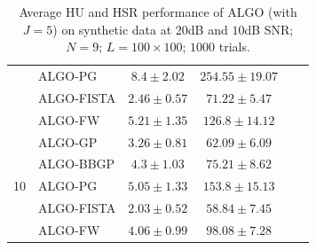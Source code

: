 \begin{table}[h]
\begin{adjustbox}{max width=\textwidth}
\begin{tabular}{|c|l|c|c|c|c|}
                    & ALGO-PG                    & $8.4      \pm 2.02$   & $254.55   \pm 19.07$ \tabularnewline
                    & ALGO-FISTA                 & $2.46     \pm 0.57$   & $71.22    \pm 5.47$  \tabularnewline
                    & ALGO-FW                    & $5.21     \pm 1.35$   & $126.8    \pm 14.12$ \tabularnewline \cline{1-4}
\multirow{5}{*}{10} & ALGO-GP                    & $3.26     \pm 0.81$   & $62.09    \pm 6.09$  \tabularnewline
                    & ALGO-BBGP                  & $4.3      \pm 1.03$   & $75.21    \pm 8.62$  \tabularnewline
                    & ALGO-PG                    & $5.05     \pm 1.33$   & $153.8    \pm 15.13$ \tabularnewline
                    & ALGO-FISTA                 & $2.03     \pm 0.52$   & $58.84    \pm 7.45$  \tabularnewline
                    & ALGO-FW                    & $4.06     \pm 0.99$   & $98.08    \pm 7.28$  \tabularnewline \cline{1-4}
\end{tabular}
\end{adjustbox}
\caption{Average HU and HSR performance of ALGO (with $J=5$) on synthetic
         data at $20$dB and $10$dB SNR; $N = 9$; $L = 100 \times 100$; $1000$
         trials.}
\label{table:results_full_MO9_SNR2010dB_J5}
\end{table}

\newpage


